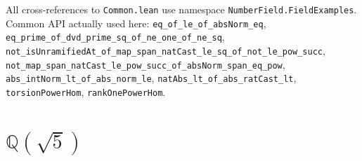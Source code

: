 \documentclass[UTF8,a4paper,11pt,fontset=fandol]{ctexart}
\theoremstyle{definition}
\begin{document}
All cross-references to \texttt{Common.\allowbreak{}lean} use namespace \texttt{NumberField.\allowbreak{}FieldExamples}. Common API actually used here: \texttt{eq\_\allowbreak{}of\_\allowbreak{}le\_\allowbreak{}of\_\allowbreak{}absNorm\_\allowbreak{}eq}, \texttt{eq\_\allowbreak{}prime\_\allowbreak{}of\_\allowbreak{}dvd\_\allowbreak{}prime\_\allowbreak{}sq\_\allowbreak{}of\_\allowbreak{}ne\_\allowbreak{}one\_\allowbreak{}of\_\allowbreak{}ne\_\allowbreak{}sq}, \texttt{not\_\allowbreak{}isUnramifiedAt\_\allowbreak{}of\_\allowbreak{}map\_\allowbreak{}span\_\allowbreak{}natCast\_\allowbreak{}le\_\allowbreak{}sq\_\allowbreak{}of\_\allowbreak{}not\_\allowbreak{}le\_\allowbreak{}pow\_\allowbreak{}succ}, \texttt{not\_\allowbreak{}map\_\allowbreak{}span\_\allowbreak{}natCast\_\allowbreak{}le\_\allowbreak{}pow\_\allowbreak{}succ\_\allowbreak{}of\_\allowbreak{}absNorm\_\allowbreak{}span\_\allowbreak{}eq\_\allowbreak{}pow}, \texttt{abs\_\allowbreak{}intNorm\_\allowbreak{}lt\_\allowbreak{}of\_\allowbreak{}abs\_\allowbreak{}norm\_\allowbreak{}le}, \texttt{natAbs\_\allowbreak{}lt\_\allowbreak{}of\_\allowbreak{}abs\_\allowbreak{}ratCast\_\allowbreak{}lt}, \texttt{torsionPowerHom}, \texttt{rankOnePowerHom}.


\section{\(\mathbb Q(\sqrt5)\)}
\end{document}
